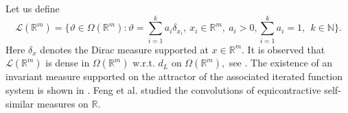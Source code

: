 \documentclass{amsproc}
\theoremstyle{definition}
\theoremstyle{remark}
\newtheorem{remark}[theorem]{Remark}
\numberwithin{equation}{section}
\begin{document}
Let us define
\[
\mathcal{L}(\mathbb{R}^m)=\Big\{\vartheta 
\in \Omega(\mathbb{R}^m): \vartheta= \sum_{i=1}^k a_i \delta_{x_i},~x_i \in \mathbb{R}^m, ~a_i > 0, \sum_{i=1}^k a_i=1,~~ k \in \mathbb{N} \Big\}.
\]
Here $\delta_x$ denotes the Dirac measure supported at $x \in \mathbb{R}^m.$ It is observed that $\mathcal{L}(\mathbb{R}^m)$ is dense in $\Omega(\mathbb{R}^m)$ w.r.t. $d_L$ on $\Omega(\mathbb{R}^m),$ see \cite{Bill}. The existence of an invariant measure supported on the attractor of the associated iterated function system is shown in \cite{H}. Feng et al. \cite{Feng} studied the convolutions of equicontractive self-similar measures on $\mathbb{R}.$ 
\end{document}
